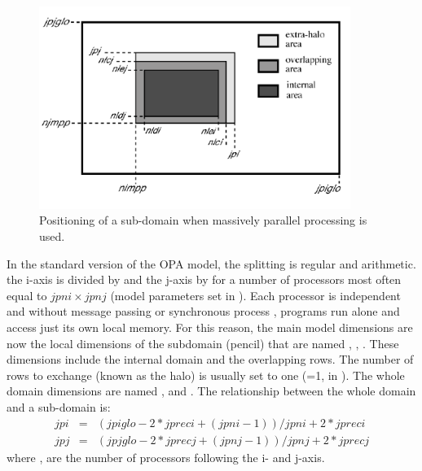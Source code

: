 \begin{figure}[!t]    \begin{center}
\includegraphics[width=0.90\textwidth]{./TexFiles/Figures/Fig_mpp.pdf}
\caption{   \label{Fig_mpp} 
Positioning of a sub-domain when massively parallel processing is used. }
\end{center}   \end{figure}

In the standard version of the OPA model, the splitting is regular and arithmetic.
 the i-axis is divided by  and the j-axis by  for a number of processors 
  most often equal to $jpni \times jpnj$ (model parameters set in 
 ). Each processor is independent and without message passing 
 or synchronous process 
 , 
 programs run alone and access just its own local memory. For this reason, the 
 main model dimensions are now the local dimensions of the subdomain (pencil) 
 that are named , , . These dimensions include the internal 
 domain and the overlapping rows. The number of rows to exchange (known as 
 the halo) is usually set to one (=1, in ). The whole domain 
 dimensions are named ,  and . The relationship between 
 the whole domain and a sub-domain is:
\begin{eqnarray} 
      jpi & = & ( jpiglo-2*jpreci + (jpni-1) ) / jpni + 2*jpreci  \nonumber \\
      jpj & = & ( jpjglo-2*jprecj + (jpnj-1) ) / jpnj + 2*jprecj  \label{Eq_lbc_jpi}
\end{eqnarray}
where ,  are the number of processors following the i- and j-axis.

